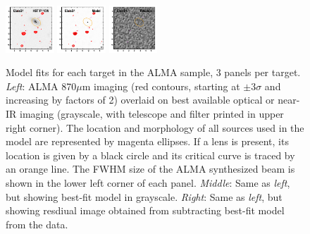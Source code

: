 \documentclass[iop]{emulateapj}
\begin{document}
\begin{figure}[!tbp]
\begin{centering}
\includegraphics[width=0.162\textwidth]{../Figures/modelfit/ElaisS1_optical_bestfit.pdf}
\includegraphics[width=0.162\textwidth]{../Figures/modelfit/ElaisS1_model_bestfit.pdf}
\includegraphics[width=0.162\textwidth]{../Figures/modelfit/ElaisS1_residual_bestfit.pdf}
\end{centering}

\caption{ Model fits for each target in the ALMA sample, 3 panels per target.
{\it Left}: ALMA 870$\mu$m imaging (red contours, starting at $\pm 3\sigma$ and
increasing by factors of 2) overlaid on best available optical or near-IR
imaging (grayscale, with telescope and filter printed in upper right corner).
The location and morphology of all sources used in the model are represented by
magenta ellipses.  If a lens is present, its location is given by a black
circle and its critical curve is traced by an orange line.  The FWHM size of
the ALMA synthesized beam is shown in the lower left corner of each panel.
{\it Middle}: Same as {\it left}, but showing best-fit model in grayscale.
{\it Right}: Same as {\it left}, but showing resdiual image obtained from
subtracting best-fit model from the data.  \label{fig:uvmodels}}
\addtocounter{figure}{-1}

\end{figure}
\end{document}
